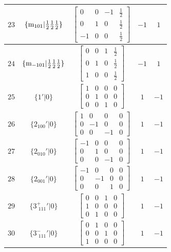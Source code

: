 \documentclass[fleqn,8pt]{jsarticle}
\begin{document}
\begin{longtable}{ccccc}
$ 23 $ & $ \{{\rm m}_{101}|\frac{1}{2} \frac{1}{2} \frac{1}{2}\} $ & $ \begin{bmatrix} 0 & 0 & -1 & \frac{1}{2} \\ 0 & 1 & 0 & \frac{1}{2} \\ -1 & 0 & 0 & \frac{1}{2} \end{bmatrix} $ & $ -1 $ & $ 1 $ \\ \hline
$ 24 $ & $ \{{\rm m}_{-101}|\frac{1}{2} \frac{1}{2} \frac{1}{2}\} $ & $ \begin{bmatrix} 0 & 0 & 1 & \frac{1}{2} \\ 0 & 1 & 0 & \frac{1}{2} \\ 1 & 0 & 0 & \frac{1}{2} \end{bmatrix} $ & $ -1 $ & $ 1 $ \\ \hline
$ 25 $ & $ \{1{}'|0\} $ & $ \begin{bmatrix} 1 & 0 & 0 & 0 \\ 0 & 1 & 0 & 0 \\ 0 & 0 & 1 & 0 \end{bmatrix} $ & $ 1 $ & $ -1 $ \\ \hline
$ 26 $ & $ \{2{}_{100}{}'|0\} $ & $ \begin{bmatrix} 1 & 0 & 0 & 0 \\ 0 & -1 & 0 & 0 \\ 0 & 0 & -1 & 0 \end{bmatrix} $ & $ 1 $ & $ -1 $ \\ \hline
$ 27 $ & $ \{2{}_{010}{}'|0\} $ & $ \begin{bmatrix} -1 & 0 & 0 & 0 \\ 0 & 1 & 0 & 0 \\ 0 & 0 & -1 & 0 \end{bmatrix} $ & $ 1 $ & $ -1 $ \\ \hline
$ 28 $ & $ \{2{}_{001}{}'|0\} $ & $ \begin{bmatrix} -1 & 0 & 0 & 0 \\ 0 & -1 & 0 & 0 \\ 0 & 0 & 1 & 0 \end{bmatrix} $ & $ 1 $ & $ -1 $ \\ \hline
$ 29 $ & $ \{3^{+}_{\,\,111}{}'|0\} $ & $ \begin{bmatrix} 0 & 0 & 1 & 0 \\ 1 & 0 & 0 & 0 \\ 0 & 1 & 0 & 0 \end{bmatrix} $ & $ 1 $ & $ -1 $ \\ \hline
$ 30 $ & $ \{3^{-}_{\,\,111}{}'|0\} $ & $ \begin{bmatrix} 0 & 1 & 0 & 0 \\ 0 & 0 & 1 & 0 \\ 1 & 0 & 0 & 0 \end{bmatrix} $ & $ 1 $ & $ -1 $ \\ \hline

\end{longtable}
\end{document}
